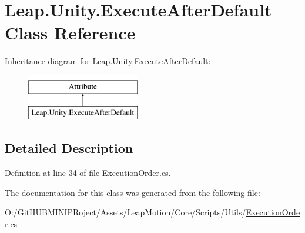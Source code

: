 \hypertarget{class_leap_1_1_unity_1_1_execute_after_default}{}\section{Leap.\+Unity.\+Execute\+After\+Default Class Reference}
\label{class_leap_1_1_unity_1_1_execute_after_default}
Inheritance diagram for Leap.\+Unity.\+Execute\+After\+Default\+:\begin{figure}[H]
\begin{center}
\leavevmode
\includegraphics[height=2.000000cm]{class_leap_1_1_unity_1_1_execute_after_default}
\end{center}
\end{figure}


\subsection{Detailed Description}


Definition at line 34 of file Execution\+Order.\+cs.



The documentation for this class was generated from the following file\+:\begin{DoxyCompactItemize}
\item 
O\+:/\+Git\+H\+U\+B\+M\+I\+N\+I\+P\+Roject/\+Assets/\+Leap\+Motion/\+Core/\+Scripts/\+Utils/\mbox{\hyperlink{_execution_order_8cs}{Execution\+Order.\+cs}}\end{DoxyCompactItemize}
